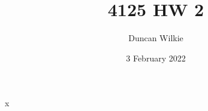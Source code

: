 \documentclass{article}
\title{4125 HW 2}
\author{Duncan Wilkie}
\date{3 February 2022}
\begin{document}
\maketitle

\section*{}
x
\end{document}
